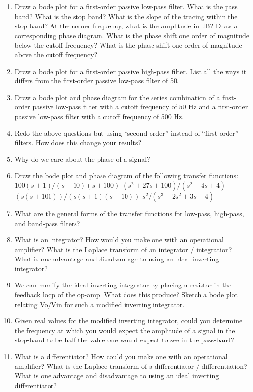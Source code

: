 \documentclass[11pt]{book}
\begin{document}
\begin{enumerate}
	\item Draw a bode plot for a first-order passive low-pass filter. What is the pass band? What is the stop band? What is the slope of the tracing within the stop band? At the corner frequency, what is the amplitude in dB? Draw a corresponding phase diagram. What is the phase shift one order of magnitude below the cutoff frequency? What is the phase shift one order of magnitude above the cutoff frequency?
	\item Draw a bode plot for a first-order passive high-pass filter. List all the ways it differs from the first-order passive low-pass filter of 50.
	\item Draw a bode plot and phase diagram for the series combination of a first-order passive low-pass filter with a cutoff frequency of 50 Hz and a first-order passive low-pass filter with a cutoff frequency of 500 Hz.
	\item Redo the above questions but using ``second-order'' instead of ``first-order'' filters. How does this change your results?
	\item Why do we care about the phase of a signal?
	\item Draw the bode plot and phase diagram of the following transfer functions:
	\subitem $100(s + 1) / (s + 10)(s + 100)$
	\subitem $(s^2 + 27s + 100) / (s^2 + 4s + 4)$
	\subitem $(s(s + 100)) / (s(s + 1)(s + 10))$
	\subitem $s^2 / (s^3 + 2s^2 + 3s + 4)$
	\item What are the general forms of the transfer functions for low-pass, high-pass, and band-pass filters?
	\item What is an integrator? How would you make one with an operational amplifier? What is the Laplace transform of an integrator / integration? What is one advantage and disadvantage to using an ideal inverting integrator?
	\item We can modify the ideal inverting integrator by placing a resistor in the feedback loop of the op-amp. What does this produce? Sketch a bode plot relating Vo/Vin for such a modified inverting integrator.
	\item Given real values for the modified inverting integrator, could you determine the frequency at which you would expect the amplitude of a signal in the stop-band to be half the value one would expect to see in the pass-band?
	\item What is a differentiator? How could you make one with an operational amplifier? What is the Laplace transform of a differentiator / differentiation? What is one advantage and disadvantage to using an ideal inverting differentiator?

\end{enumerate}
\end{document}
